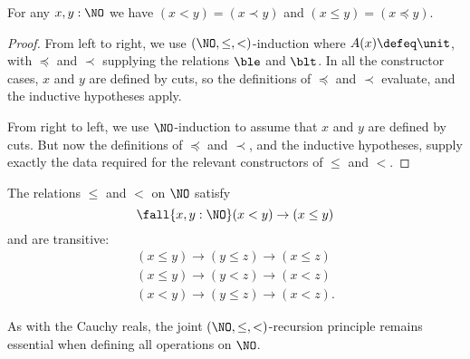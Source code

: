 \begin{thm}\label{thm:NO-encode-decode}
  For any $x,y:\NO$ we have $(x<y)=(x\prec y)$ and $(x\le y)=(x\preceq y)$.
\end{thm}
\begin{proof}
  From left to right, we use $(\NO,\le,<)$-induction where $A(x)\defeq\unit$, with $\preceq$ and $\prec$ supplying the relations $\ble$ and $\blt$.
  In all the constructor cases, $x$ and $y$ are defined by cuts, so the definitions of $\preceq$ and $\prec$ evaluate, and the inductive hypotheses apply.

  From right to left, we use $\NO$-induction to assume that $x$ and $y$ are defined by cuts.
  But now the definitions of $\preceq$ and $\prec$, and the inductive hypotheses, supply exactly the data required for the relevant constructors of $\le$ and $<$.
\end{proof}

\begin{cor}\label{thm:NO-unstrict-transitive}
  The relations $\le$ and $<$ on $\NO$ satisfy
  \[ \fall{x,y:\NO} (x<y) \to (x\le y) \]
  and are transitive:
  \begin{gather*}
    (x\le y) \to (y\le z) \to (x\le z)\\
    (x\le y) \to (y< z) \to (x< z)\\
    (x< y) \to (y\le z) \to (x< z).
  \end{gather*}
\end{cor}

As with the Cauchy reals, the joint $(\NO,\le,<)$-recursion principle remains essential when defining all operations on $\NO$.

